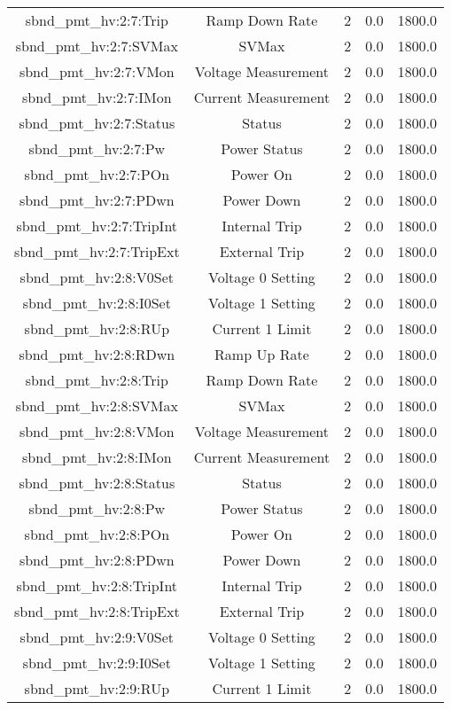 \begin{table}[ptb]
\begin{tabular}{c | c c c c}
sbnd_pmt_hv:2:7:Trip & Ramp Down Rate & 2 & 0.0 & 1800.0\\ 
sbnd_pmt_hv:2:7:SVMax & SVMax & 2 & 0.0 & 1800.0\\ 
sbnd_pmt_hv:2:7:VMon & Voltage Measurement & 2 & 0.0 & 1800.0\\ 
sbnd_pmt_hv:2:7:IMon & Current Measurement & 2 & 0.0 & 1800.0\\ 
sbnd_pmt_hv:2:7:Status & Status & 2 & 0.0 & 1800.0\\ 
sbnd_pmt_hv:2:7:Pw & Power Status & 2 & 0.0 & 1800.0\\ 
sbnd_pmt_hv:2:7:POn & Power On & 2 & 0.0 & 1800.0\\ 
sbnd_pmt_hv:2:7:PDwn & Power Down & 2 & 0.0 & 1800.0\\ 
sbnd_pmt_hv:2:7:TripInt & Internal Trip & 2 & 0.0 & 1800.0\\ 
sbnd_pmt_hv:2:7:TripExt & External Trip & 2 & 0.0 & 1800.0\\ 
sbnd_pmt_hv:2:8:V0Set & Voltage 0 Setting & 2 & 0.0 & 1800.0\\ 
sbnd_pmt_hv:2:8:I0Set & Voltage 1 Setting & 2 & 0.0 & 1800.0\\ 
sbnd_pmt_hv:2:8:RUp & Current 1 Limit & 2 & 0.0 & 1800.0\\ 
sbnd_pmt_hv:2:8:RDwn & Ramp Up Rate & 2 & 0.0 & 1800.0\\ 
sbnd_pmt_hv:2:8:Trip & Ramp Down Rate & 2 & 0.0 & 1800.0\\ 
sbnd_pmt_hv:2:8:SVMax & SVMax & 2 & 0.0 & 1800.0\\ 
sbnd_pmt_hv:2:8:VMon & Voltage Measurement & 2 & 0.0 & 1800.0\\ 
sbnd_pmt_hv:2:8:IMon & Current Measurement & 2 & 0.0 & 1800.0\\ 
sbnd_pmt_hv:2:8:Status & Status & 2 & 0.0 & 1800.0\\ 
sbnd_pmt_hv:2:8:Pw & Power Status & 2 & 0.0 & 1800.0\\ 
sbnd_pmt_hv:2:8:POn & Power On & 2 & 0.0 & 1800.0\\ 
sbnd_pmt_hv:2:8:PDwn & Power Down & 2 & 0.0 & 1800.0\\ 
sbnd_pmt_hv:2:8:TripInt & Internal Trip & 2 & 0.0 & 1800.0\\ 
sbnd_pmt_hv:2:8:TripExt & External Trip & 2 & 0.0 & 1800.0\\ 
sbnd_pmt_hv:2:9:V0Set & Voltage 0 Setting & 2 & 0.0 & 1800.0\\ 
sbnd_pmt_hv:2:9:I0Set & Voltage 1 Setting & 2 & 0.0 & 1800.0\\ 
sbnd_pmt_hv:2:9:RUp & Current 1 Limit & 2 & 0.0 & 1800.0\\ 

\end{tabular}
\end{table}
